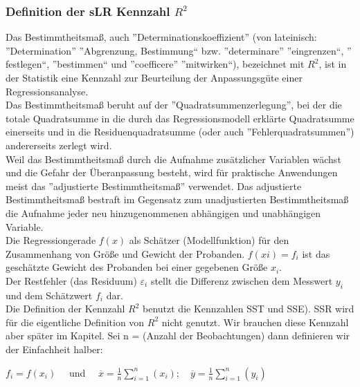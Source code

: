 \documentclass[12pt]{article}
\begin{document}
\subsubsection{Definition der sLR Kennzahl $ R^2 $}
%
Das Bestimmtheitsmaß, auch ”Determinationskoeffizient” (von lateinisch: ”Determination”
”Abgrenzung, Bestimmung“ bzw. ”determinare” ”eingrenzen“, ” festlegen“, ”bestimmen“ und ”coefficere” ”mitwirken“), bezeichnet mit $R^2$, ist in der Statistik
eine Kennzahl zur Beurteilung der Anpassungsgüte einer Regressionsanalyse.\\
Das Bestimmtheitsmaß beruht auf der ”Quadratsummenzerlegung”, bei der die totale
Quadratsumme in die durch das Regressionsmodell erklärte Quadratsumme einerseits
und in die Residuenquadratsumme (oder auch ”Fehlerquadratsummen”) andererseits
zerlegt wird.\\[0.2cm]
Weil das Bestimmtheitsmaß durch die Aufnahme zusätzlicher Variablen wächst und
die Gefahr der Überanpassung besteht, wird für praktische Anwendungen meist das
”adjustierte Bestimmtheitsmaß” verwendet. Das adjustierte Bestimmtheitsmaß bestraft
im Gegensatz zum unadjustierten Bestimmtheitsmaß die Aufnahme jeder neu
hinzugenommenen abhängigen und unabhängigen Variable.\\[0.2cm]
Die Regressiongerade $f(x)$ als Schätzer (Modellfunktion) für den Zusammenhang von
Größe und Gewicht der Probanden. $f(xi) = f_i $  ist das geschätzte Gewicht des
Probanden bei einer gegebenen Größe $x_i$.\\[0.2cm]
Der Restfehler (das Residuum) $\varepsilon_i$ stellt die Differenz zwischen dem Messwert $y_i$ und dem Schätzwert $f_i$ dar.\\[0.2cm]
%
Die Definition der Kennzahl $R^2$ benutzt die Kennzahlen SST und SSE). SSR wird für die eigentliche Definition von $R^2$ nicht genutzt. Wir brauchen diese Kennzahl aber später im Kapitel. Sei n = (Anzahl der Beobachtungen) dann definieren wir der Einfachheit halber: 
\begin{center}
$ f_i = f(x_i)\quad $ und $ \quad \overline{x} = \frac{1}{n} \sum\limits_{i=1}^n (x_i) ; \quad \overline{y} = \frac{1}{n} \sum\limits_{i=1}^n (y_i) $\\
\end{center} 
\end{document}
